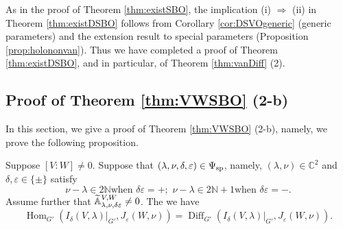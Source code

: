 As in the proof of Theorem \ref{thm:existSBO}, 
 the implication (i) $\Rightarrow$ (ii) in Theorem \ref{thm:existDSBO}
 follows from Corollary \ref{cor:DSVOgeneric}
 (generic parameters) and the extension result to special parameters
 (Proposition \ref{prop:holononvan}).  
Thus we have completed a proof
 of Theorem \ref{thm:existDSBO}, 
 and in particular,
 of Theorem \ref{thm:vanDiff} (2).  



\subsection{Proof of Theorem \ref{thm:VWSBO} (2-b)}
\label{subsec:170213}

In this section, 
 we give a proof of Theorem \ref{thm:VWSBO} (2-b), 
 namely,
 we prove the following proposition.  

\begin{proposition}
\label{prop:1532102}
Suppose $[V:W]\ne 0$.  
Suppose that 
 $(\lambda,\nu,\delta,\varepsilon) \in \Psi_{{\operatorname{sp}}}$, 
 namely, 
 $(\lambda, \nu)\in {\mathbb{C}}^2$
 and $\delta, \varepsilon \in \{ \pm \}$
 satisfy
\[
  \text{
   $\nu-\lambda \in 2 {\mathbb{N}}$
   when $\delta \varepsilon =+;$
   $\nu-\lambda \in 2 {\mathbb{N}}+1$
   when $\delta \varepsilon =-$.  
  }
\]
Assume further that ${\widetilde{\mathbb{A}}}_{{\lambda},{\nu},{\delta\varepsilon}}^{{V,W}} \ne 0$.  
The we have 
\[
 {\operatorname{Hom}}_{G'}
 (I_{\delta}(V, \lambda)|_{G'}, 
  J_{\varepsilon}(W, \nu)
 )
 =
 {\operatorname{Diff}}_{G'}
 (I_{\delta}(V, \lambda)|_{G'}, 
  J_{\varepsilon}(W, \nu)
 ).  
\]
\end{proposition}


